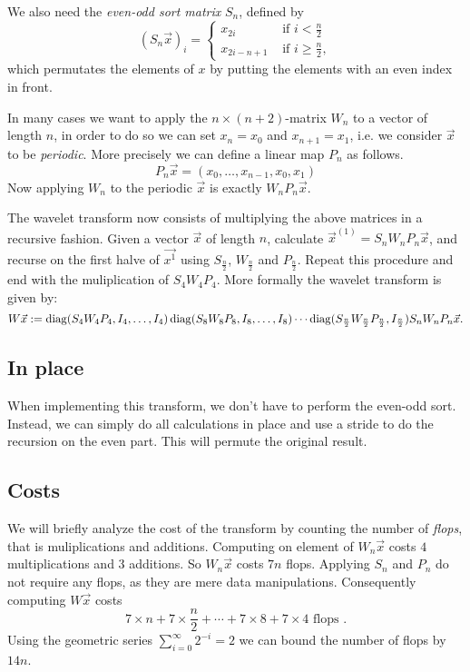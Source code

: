 We also need the \emph{even-odd sort matrix} $S_n$, defined by
\[ (S_n \vec{x})_i = \begin{cases}
	x_{2i}         &\mbox{ if } i  <   \frac{n}{2} \\
	x_{2i - n + 1} &\mbox{ if } i \geq \frac{n}{2},
\end{cases}\]
which permutates the elements of $x$ by putting the elements with an even index in front.

In many cases we want to apply the $n \times (n+2)$-matrix $W_n$ to a vector of length $n$, in order to do so we can set $x_n = x_0$ and $x_{n+1} = x_1$, i.e. we consider $\vec{x}$ to be \emph{periodic}. More precisely we can define a linear map $P_n$ as follows.
\[ P_n \vec{x} = (x_0, \ldots, x_{n-1}, x_0, x_1) \]
Now applying $W_n$ to the periodic $\vec{x}$ is exactly $W_n P_n \vec{x}$.

The wavelet transform now consists of multiplying the above matrices in a recursive fashion. Given a vector $\vec{x}$ of length $n$, calculate $\vec{x}^{(1)} = S_n W_n P_n \vec{x}$, and recurse on the first halve of $\vec{x^1}$ using $S_\frac{n}{2}$, $W_\frac{n}{2}$ and $P_\frac{n}{2}$. Repeat this procedure and end with the muliplication of $S_4 W_4 P_4$. More formally the wavelet transform is given by:
\[ W \vec{x} := \operatorname{diag}(S_4 W_4 P_4, I_4, \ldots, I_4) 
             \operatorname{diag}(S_8 W_8 P_8, I_8, \ldots, I_8) \cdots
             \operatorname{diag}(S_\frac{n}{2} W_\frac{n}{2} P_\frac{n}{2}, I_\frac{n}{2})
             S_n W_n P_n \vec{x}. \]


\subsection{In place}
When implementing this transform, we don't have to perform the even-odd sort. Instead, we can simply do all calculations in place and use a stride to do the recursion on the even part. This will permute the original result.


\subsection{Costs}
We will briefly analyze the cost of the transform by counting the number of \emph{flops}, that is muliplications and additions. Computing on element of $W_n \vec{x}$ costs $4$ multiplications and $3$ additions. So $W_n \vec{x}$ costs $7n$ flops. Applying $S_n$ and $P_n$ do not require any flops, as they are mere data manipulations. Consequently computing $W \vec{x}$ costs
\[ 7 \times n + 7 \times \frac{n}{2} + \cdots +  7 \times 8 + 7 \times 4 \text{ flops }. \]
Using the geometric series $\sum_{i=0}^\infty 2^{-i} = 2$ we can bound the number of flops by $14n$.

